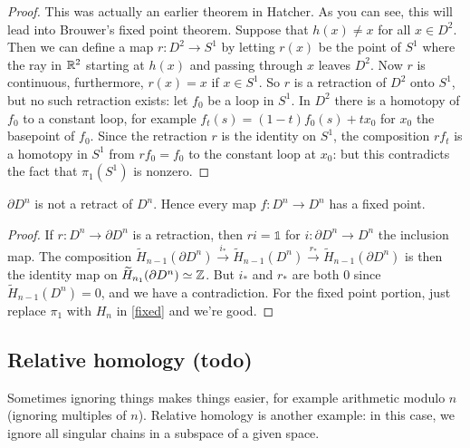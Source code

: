 \begin{proof}
    This was actually an earlier theorem in Hatcher. As you can see, this will lead into Brouwer's fixed point theorem. Suppose that $h(x)\neq x$ for all $x\in D^2$. Then we can define a map $r\colon D^2 \to S^{1} $ by letting $r(x)$ be the point of $S^{1} $ where the ray in $\mathbb{R}^2$ starting at $h(x)$ and passing through $x$ leaves $D^2$. Now $r$ is continuous, furthermore, $r(x)=x$ if $x\in S^{1} $. So $r$ is a retraction of $D^2$ onto $S^{1} $, but no such retraction exists: let $f_0$ be a loop in $S^{1} $. In $D^2$ there is a homotopy of $f_0$ to a constant loop, for example $f_t(s)=(1-t)f_0(s)+tx_0$ for $x_0$ the basepoint of $f_0$. Since the retraction $r$ is the identity on $S^{1} $, the composition $rf_t$ is a homotopy in $S^{1} $ from $rf_0=f_0$ to the constant loop at $x_0$: but this contradicts the fact that $\pi_1(S^{1} )$ is nonzero.
\end{proof}
\begin{cor}
    $\partial D^n $ is not a retract of $D^n $. Hence every map $f\colon D^n  \to D^n $ has a fixed point. 
\end{cor}
\begin{proof}
    If $r \colon D^n  \to \partial D^n $ is a retraction, then $ri=\mathbb{1}$ for $i \colon \partial D^n  \to D^n $ the inclusion map. The composition $\widetilde H_{n-1}(\partial D^n )\overset{i_*}{\longrightarrow} \widetilde H_{n-1}(D^n )\overset{r_*}{\longrightarrow} \widetilde H_{n-1}(\partial D^n )$ is then the identity map on $\widetilde H_{n_1}(\partial D^n )\simeq\mathbb{Z}$. But $i_*$ and $r_*$ are both $0$ since $\widetilde H_{n-1}(D^n )=0$, and we have a contradiction. For the fixed point portion, just replace $\pi_1$ with $H_n $ in \cref{fixed} and we're good.
\end{proof}

\subsection{Relative homology (todo)}
Sometimes ignoring things makes things easier, for example arithmetic modulo $n$ (ignoring multiples of $n$). Relative homology is another example: in this case, we ignore all singular chains in a subspace of a given space. 

